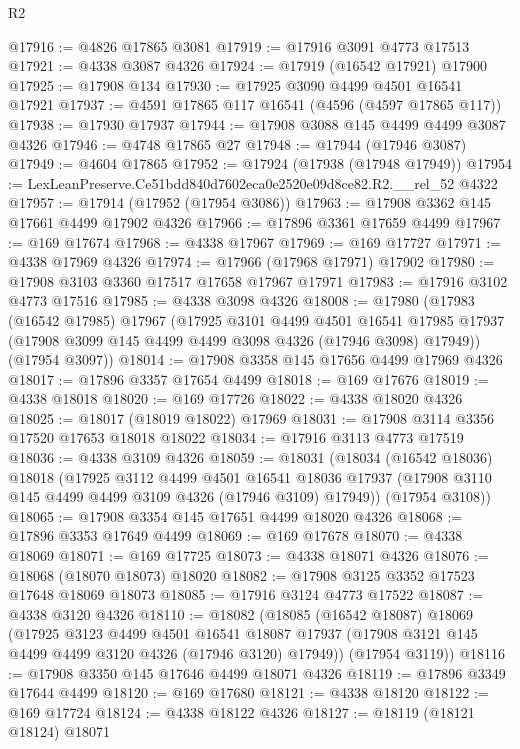 \begin{lexlean}{R2}
\begin{coremodule}
@17916 := @4826 @17865 @3081
@17919 := @17916 @3091 @4773 @17513
@17921 := @4338 @3087 @4326
@17924 := @17919 (@16542 @17921) @17900
@17925 := @17908 @134
@17930 := @17925 @3090 @4499 @4501 @16541 @17921
@17937 := @4591 @17865 @117 @16541 (@4596 (@4597 @17865 @117))
@17938 := @17930 @17937
@17944 := @17908 @3088 @145 @4499 @4499 @3087 @4326
@17946 := @4748 @17865 @27
@17948 := @17944 (@17946 @3087)
@17949 := @4604 @17865
@17952 := @17924 (@17938 (@17948 @17949))
@17954 := LexLeanPreserve.Ce51bdd840d7602eca0e2520e09d8ce82.R2.__rel_52 @4322
@17957 := @17914 (@17952 (@17954 @3086))
@17963 := @17908 @3362 @145 @17661 @4499 @17902 @4326
@17966 := @17896 @3361 @17659 @4499
@17967 := @169 @17674
@17968 := @4338 @17967
@17969 := @169 @17727
@17971 := @4338 @17969 @4326
@17974 := @17966 (@17968 @17971) @17902
@17980 := @17908 @3103 @3360 @17517 @17658 @17967 @17971
@17983 := @17916 @3102 @4773 @17516
@17985 := @4338 @3098 @4326
@18008 := @17980
    (@17983
      (@16542 @17985)
      @17967
      (@17925
        @3101
        @4499
        @4501
        @16541
        @17985
        @17937
        (@17908 @3099 @145 @4499 @4499 @3098 @4326 (@17946 @3098) @17949))
      (@17954 @3097))
@18014 := @17908 @3358 @145 @17656 @4499 @17969 @4326
@18017 := @17896 @3357 @17654 @4499
@18018 := @169 @17676
@18019 := @4338 @18018
@18020 := @169 @17726
@18022 := @4338 @18020 @4326
@18025 := @18017 (@18019 @18022) @17969
@18031 := @17908 @3114 @3356 @17520 @17653 @18018 @18022
@18034 := @17916 @3113 @4773 @17519
@18036 := @4338 @3109 @4326
@18059 := @18031
    (@18034
      (@16542 @18036)
      @18018
      (@17925
        @3112
        @4499
        @4501
        @16541
        @18036
        @17937
        (@17908 @3110 @145 @4499 @4499 @3109 @4326 (@17946 @3109) @17949))
      (@17954 @3108))
@18065 := @17908 @3354 @145 @17651 @4499 @18020 @4326
@18068 := @17896 @3353 @17649 @4499
@18069 := @169 @17678
@18070 := @4338 @18069
@18071 := @169 @17725
@18073 := @4338 @18071 @4326
@18076 := @18068 (@18070 @18073) @18020
@18082 := @17908 @3125 @3352 @17523 @17648 @18069 @18073
@18085 := @17916 @3124 @4773 @17522
@18087 := @4338 @3120 @4326
@18110 := @18082
    (@18085
      (@16542 @18087)
      @18069
      (@17925
        @3123
        @4499
        @4501
        @16541
        @18087
        @17937
        (@17908 @3121 @145 @4499 @4499 @3120 @4326 (@17946 @3120) @17949))
      (@17954 @3119))
@18116 := @17908 @3350 @145 @17646 @4499 @18071 @4326
@18119 := @17896 @3349 @17644 @4499
@18120 := @169 @17680
@18121 := @4338 @18120
@18122 := @169 @17724
@18124 := @4338 @18122 @4326
@18127 := @18119 (@18121 @18124) @18071

\end{coremodule}
\end{lexlean}
